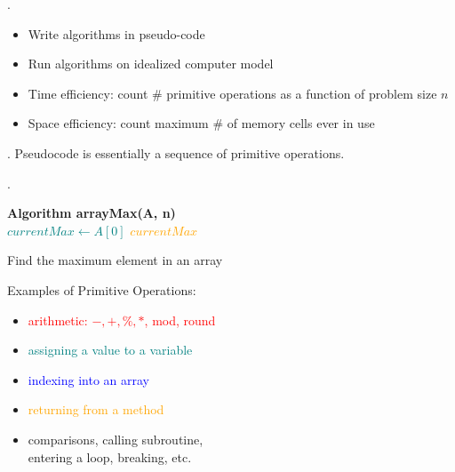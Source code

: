 \documentclass{article}
\begin{document}
\begin{algo}.
    \begin{itemize}
        \item Write algorithms in pseudo-code 
        \item Run algorithms on idealized computer model 
        \item Time efficiency: count \# primitive operations as a function of problem size $n$
        \item Space efficiency: count maximum \# of memory cells ever in use
    \end{itemize}
\end{algo}

\begin{comm}[].
    Pseudocode is essentially a sequence of primitive operations. 
\end{comm}

\begin{examplee}.
    \begin{minipage}{0.6\textwidth}
        \begin{algorithm}[H]
            \SetAlgoLined %
            
            \textbf{Algorithm arrayMax(A, n)}\\
            \textcolor{teal}{$currentMax \leftarrow A[0]$}\;
            \textcolor{orange}{\Return $currentMax$}\;
            \caption{Find the maximum element in an array}
        \end{algorithm}
    \end{minipage}\begin{minipage}{0.4\textwidth}
        \quad Examples of Primitive Operations: 
        \begin{itemize}
            \item \textcolor{red}{arithmetic: $-, +, \%, *$, mod, round} 
            \item \textcolor{teal}{assigning a value to a variable}       
            \item \textcolor{blue}{indexing into an array} 
            \item \textcolor{orange}{returning from a method}  
            \item comparisons, calling subroutine, \\ entering a loop, breaking, etc.
        \end{itemize}
    \end{minipage}
\end{examplee}
\end{document}
